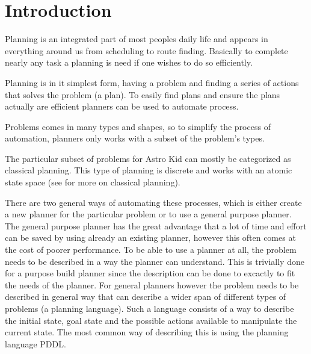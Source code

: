 \chapter{Introduction}	
	Planning is an integrated part of most peoples daily life and appears in everything around us from scheduling to route finding. Basically to complete nearly any task a planning is need if one wishes to do so efficiently.

	Planning is in it simplest form, having a problem and finding a series of actions that solves the problem (a plan). To easily find plans and ensure the plans actually are efficient planners can be used to automate process.  
	
	Problems comes in many types and shapes, so to simplify the process of automation, planners only works with a subset of the problem's types. 

	The particular subset of problems for Astro Kid can mostly be categorized as classical planning. This type of planning is discrete and works with an atomic state space (see \cite{russell2014a} for more on classical planning).
	
	

	There are two general ways of automating these processes, which is either create a new planner for the particular problem or to use a general purpose planner. 
	The general purpose planner has the great advantage that a lot of time and effort can be saved by using already an existing planner, however this often comes at the cost of poorer performance.
	To be able to use a planner at all, the problem needs to be described in a way the planner can understand. This is trivially done for a purpose build planner since the description can be done to excactly to fit the needs of the planner. For general planners however the problem needs to be described in general way that can describe a wider span of different types of problems (a planning language). 	Such a language consists of a way to describe the initial state, goal state and the possible actions available to manipulate the current state. The most common way of describing this is using the planning language PDDL. 
	

%


